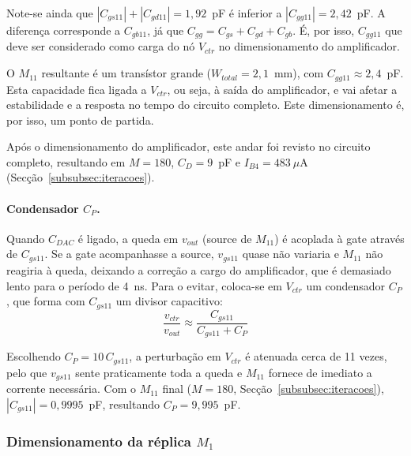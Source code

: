 Note-se ainda que $|C_{gs11}| + |C_{gd11}| = 1{,}92$~pF é inferior a $|C_{gg11}| = 2{,}42$~pF. A diferença corresponde a
$C_{gb11}$, já que $C_{gg} = C_{gs} + C_{gd} + C_{gb}$. É, por isso, $C_{gg11}$ que deve ser considerado como carga do nó
$V_{ctr}$ no dimensionamento do amplificador.

O $M_{11}$ resultante é um transístor grande ($W_{total} = 2{,}1$~mm), com $C_{gg11} \approx 2{,}4$~pF.
Esta capacidade fica ligada a $V_{ctr}$, ou seja, à saída do amplificador, e vai afetar a estabilidade e a resposta no
tempo do circuito completo. Este dimensionamento é, por isso, um ponto de partida.

Após o dimensionamento do amplificador, este andar foi revisto no circuito completo, resultando em $M = 180$,
$C_D = 9$~pF e $I_{B4} = 483~\mu$A (Secção~\ref{subsubsec:iteracoes}).

\paragraph{Condensador $C_P$.}
Quando $C_{DAC}$ é ligado, a queda em $v_{out}$ (source de $M_{11}$) é acoplada à gate através de $C_{gs11}$. Se a gate
acompanhasse a source, $v_{gs11}$ quase não variaria e $M_{11}$ não reagiria à queda, deixando a correção a cargo do
amplificador, que é demasiado lento para o período de 4~ns. Para o evitar, coloca-se em $V_{ctr}$ um condensador $C_P$,
que forma com $C_{gs11}$ um divisor capacitivo:
\begin{equation}
    \frac{v_{ctr}}{v_{out}} \approx \frac{C_{gs11}}{C_{gs11} + C_P}
\end{equation}

Escolhendo $C_P = 10\,C_{gs11}$, a perturbação em $V_{ctr}$ é atenuada cerca de 11 vezes, pelo que $v_{gs11}$ sente
praticamente toda a queda e $M_{11}$ fornece de imediato a corrente necessária. Com o $M_{11}$ final ($M = 180$,
Secção~\ref{subsubsec:iteracoes}), $|C_{gs11}| = 0{,}9995$~pF, resultando $C_P = 9{,}995$~pF.


\subsubsection{Dimensionamento da réplica $M_1$}
\label{subsubsec:dimensionamento_m1}

